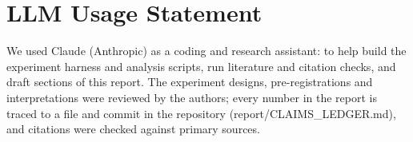 \documentclass[11pt]{article}
\begin{document}
\section*{LLM Usage Statement}
We used Claude (Anthropic) as a coding and research assistant: to help build the experiment harness and analysis scripts, run literature and citation checks, and draft sections of this report. The experiment designs, pre-registrations and interpretations were reviewed by the authors; every number in the report is traced to a file and commit in the repository (report/CLAIMS\_LEDGER.md), and citations were checked against primary sources.
\end{document}

